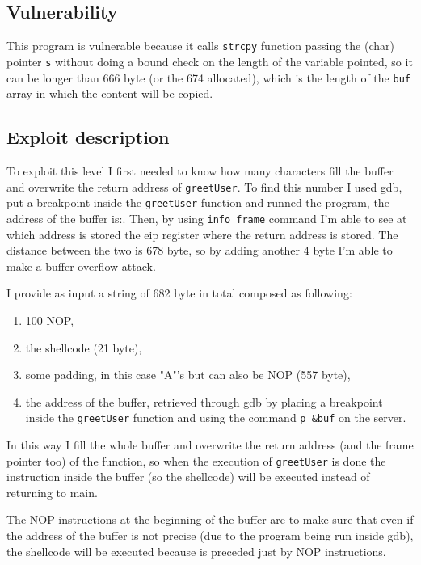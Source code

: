 \documentclass[a4paper,12pt]{article}
\begin{document}
\subsection{Vulnerability}

This program is vulnerable because it calls \texttt{strcpy} function passing the (char) pointer \texttt{s} without doing a bound check on the length of the variable pointed, so it can be longer than 666 byte (or the 674 allocated), which is the length of the \texttt{buf} array in which the content will be copied.

\subsection{Exploit description}

To exploit this level I first needed to know how many characters fill the buffer and overwrite the return address of \texttt{greetUser}. To find this number I used gdb, put a breakpoint inside the \texttt{greetUser} function and runned the program, the address of the buffer is:. Then, by using \texttt{info frame} command I'm able to see at which address is stored the eip register where the return address is stored. The distance between the two is 678 byte, so by adding another 4 byte I'm able to make a buffer overflow attack.

I provide as input a string of 682 byte in total composed as following:
\begin{enumerate}
\item 100 NOP,
\item the shellcode (21 byte),
\item some padding, in this case "A"'s but can also be NOP (557 byte),
\item the address of the buffer, retrieved through gdb by placing a breakpoint inside the \texttt{greetUser} function and using the command \texttt{p \&buf} on the server.
\end{enumerate}


In this way I fill the whole buffer and overwrite the return address (and the frame pointer too) of the function, so when the execution of \texttt{greetUser} is done the instruction inside the buffer (so the shellcode) will be executed instead of returning to main. 

The NOP instructions at the beginning of the buffer are to make sure that even if the address of the buffer is not precise (due to the program being run inside gdb), the shellcode will be executed because is preceded just by NOP instructions.
\end{document}
